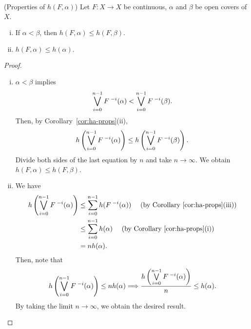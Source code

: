 \documentclass[10pt,twoside,draft]{book}
\begin{document}
\begin{proposition}
  (Properties of $h(F, \alpha)$)
  Let $F: X \to X$ be continuous, $\alpha$ and $\beta$ be open covers of $X$.
  \begin{enumerate}[(i)]
    \item If $\alpha < \beta$, then $h(F, \alpha) \leq h(F, \beta)$.
    \item $h(F, \alpha) \leq h(\alpha)$.
  \end{enumerate}
  \label{prop:hfa-props}
  \begin{proof}
   \begin{enumerate}[(i)]
    \item 
      $\alpha < \beta$ implies
      \begin{equation*}
        \bigvee\limits_{i=0}^{n-1} F^{\;-i}(\alpha)
        <
        \bigvee\limits_{i=0}^{n-1} F^{\;-i}(\beta).
      \end{equation*}
      Then, by Corollary~\ref{cor:ha-props}(ii),
      \begin{equation*}
        h\left (  \bigvee\limits_{i=0}^{n-1} F^{\;-i}(\alpha)  \right )
        \leq
        h\left (  \bigvee\limits_{i=0}^{n-1} F^{\;-i}(\beta)  \right ).
      \end{equation*}
      Divide both sides of the last equation by $n$ and take $n \to \infty$.
      We obtain $h(F, \alpha) \leq h(F, \beta)$.
    \item 
      We have
      \begin{align*}
        h\left (  \bigvee\limits_{i=0}^{n-1} F^{\;-i}(\alpha)  \right )
        &\leq \sum\limits_{i=0}^{n-1} h(F^{\;-i}(\alpha)) 
        \quad\mbox{ (by Corollary~\ref{cor:ha-props}(iii))} \\
        &\leq \sum\limits_{i=0}^{n-1} h(\alpha) 
        \quad\mbox{ (by Corollary~\ref{cor:ha-props}(i))}  \\
        &= n h(\alpha).
      \end{align*}
      Then, note that
      \begin{equation*}
        h\left (  \bigvee\limits_{i=0}^{n-1} F^{\;-i}(\alpha)  \right )
        \leq n h(\alpha)
        \Longrightarrow 
        \frac{ h\left (  \bigvee\limits_{i=0}^{n-1} F^{\;-i}(\alpha)  \right ) }{n}
        \leq h(\alpha).
      \end{equation*}
      By taking the limit $n \to \infty$, we obtain the desired result.
  \end{enumerate}
  \end{proof}
\end{proposition}
\end{document}
